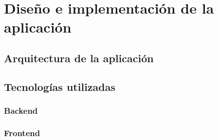 \chapter{Diseño e implementación de la aplicación}

\section{Arquitectura de la aplicación}

\section{Tecnologías utilizadas}

\subsection{Backend}

\subsection{Frontend}